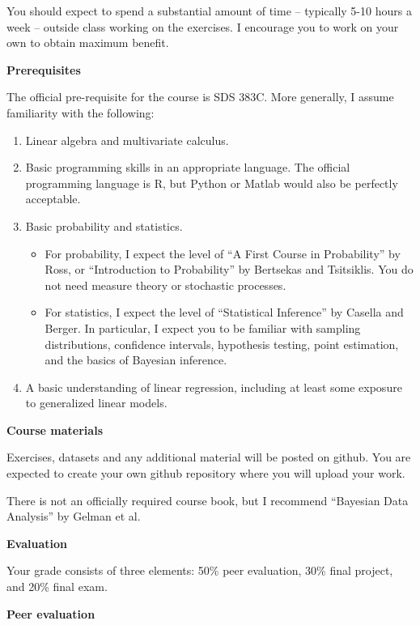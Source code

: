 \documentclass[11pt]{article}
\begin{document}
You should expect to spend a substantial amount of time -- typically 5-10 hours a week -- outside class working on the exercises. I encourage you to work on your own to obtain maximum benefit. 

\newpage

\textbf{Prerequisites}

The official pre-requisite for the course is SDS 383C. More generally, I assume familiarity with the following:
\begin{enumerate}
\item Linear algebra and multivariate calculus.
\item Basic programming skills in an appropriate language. The official programming language is R, but Python or Matlab would also be perfectly acceptable.
\item Basic probability and statistics.
  \begin{itemize}
    \item For probability, I expect the level of ``A First Course in Probability'' by Ross, or ``Introduction
      to Probability'' by Bertsekas and Tsitsiklis. You do not need measure theory or stochastic processes.
    \item For statistics, I expect the level of ``Statistical Inference'' by Casella and Berger. In particular, I expect you to be familiar with sampling distributions, confidence intervals, hypothesis testing, point estimation, and the basics of Bayesian inference.
  \end{itemize}
\item A basic understanding of linear regression, including at least some exposure to generalized linear models.
\end{enumerate}
  

\vspace{5mm}


\textbf{\large Course materials}

Exercises, datasets and any additional material will be posted on github. You are expected to create your own github repository where you will upload your work. 

There is not an officially required course book, but I recommend ``Bayesian Data Analysis'' by Gelman et al.


\textbf {\large Evaluation}

Your grade consists of three elements: 50\% peer evaluation, 30\% final project, and 20\% final exam.


\textbf{Peer evaluation}
\end{document}
